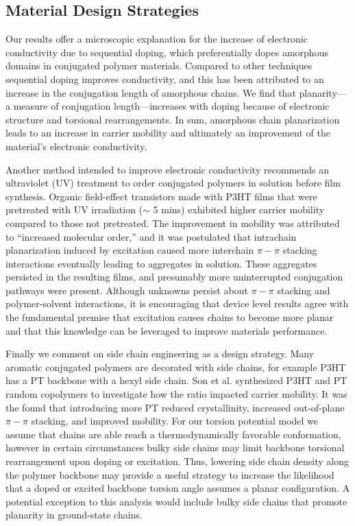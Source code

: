 \subsection{Material Design Strategies}

Our results offer a microscopic explanation for the increase of electronic conductivity due to sequential doping, which preferentially dopes amorphous domains in conjugated polymer materials.\cite{Chew2017, Jacobs2016} Compared to other techniques sequential doping improves conductivity, and this has been attributed to an increase in the conjugation length of amorphous chains.\cite{Chew2017} We find that planarity---a measure of conjugation length---increases with doping because of electronic structure and torsional rearrangements. In sum, amorphous chain planarization leads to an increase in carrier mobility and ultimately an improvement of the material's electronic conductivity.

Another method intended to improve electronic conductivity recommends an ultraviolet (UV) treatment to order conjugated polymers in solution before film synthesis.\cite{Chang2014} Organic field-effect transistors made with P3HT films that were pretreated with UV irradiation ($\sim$ 5 mins) exhibited higher carrier mobility compared to those not pretreated. The improvement in mobility was attributed to ``increased molecular order,'' and it was postulated that intrachain planarization induced by excitation caused more interchain $\pi-\pi$ stacking interactions eventually leading to aggregates in solution. These aggregates persisted in the resulting films,\cite{Chang2014} and presumably more uninterrupted conjugation pathways were present. Although unknowns persist about $\pi-\pi$ stacking and polymer-solvent interactions, it is encouraging that device level results agree with the fundamental premise that excitation causes chains to become more planar and that this knowledge can be leveraged to improve materials performance.

Finally we comment on side chain engineering as a design strategy. Many aromatic conjugated polymers are decorated with side chains, for example P3HT has a PT backbone with a hexyl side chain. Son et al. synthesized P3HT and PT random copolymers to investigate how the ratio impacted carrier mobility. It was the found that introducing more PT reduced crystallinity, increased out-of-plane $\pi-\pi$ stacking, and improved mobility.\cite{Son2016} For our torsion potential model we assume that chains are able reach a thermodynamically favorable conformation, however in certain circumstances bulky side chains may limit backbone torsional rearrangement upon doping or excitation. Thus, lowering side chain density along the polymer backbone may provide a useful strategy to increase the likelihood that a doped or excited backbone torsion angle assumes a planar configuration. A potential exception to this analysis would include bulky side chains that promote planarity in ground-state chains.\cite{Raithel2018}

